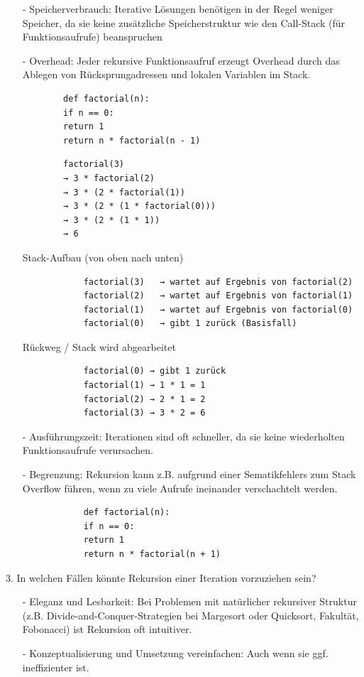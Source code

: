 \documentclass[a4paper,12pt]{article}
\begin{document}
	\begin{enumerate}
		\item[-] Speicherverbrauch: Iterative Lösungen benötigen in der Regel weniger Speicher, da sie keine zusätzliche Speicherstruktur wie den Call-Stack (für Funktionsaufrufe) beanspruchen
		\item[-] Overhead: Jeder rekursive Funktionsaufruf erzeugt Overhead durch das Ablegen von Rücksprungadressen und lokalen Variablen im Stack.
		\begin{verbatim}
		def factorial(n):
		if n == 0:
		return 1
		return n * factorial(n - 1)
		\end{verbatim}
		
		\begin{verbatim}
		factorial(3)
		→ 3 * factorial(2)
		→ 3 * (2 * factorial(1))
		→ 3 * (2 * (1 * factorial(0)))
		→ 3 * (2 * (1 * 1))
		→ 6	
		\end{verbatim}
		Stack-Aufbau (von oben nach unten)
		\begin{verbatim}
			factorial(3)   → wartet auf Ergebnis von factorial(2)
			factorial(2)   → wartet auf Ergebnis von factorial(1)
			factorial(1)   → wartet auf Ergebnis von factorial(0)
			factorial(0)   → gibt 1 zurück (Basisfall)
		\end{verbatim}
		Rückweg / Stack wird abgearbeitet
		\begin{verbatim}
			factorial(0) → gibt 1 zurück
			factorial(1) → 1 * 1 = 1
			factorial(2) → 2 * 1 = 2
			factorial(3) → 3 * 2 = 6
		\end{verbatim}
		
		\item[-] Ausführungszeit: Iterationen sind oft schneller, da sie keine wiederholten Funktionsaufrufe verursachen.
		
		\item[-] Begrenzung: Rekursion kann z.B. aufgrund einer Sematikfehlers zum Stack Overflow führen, wenn zu viele Aufrufe ineinander verschachtelt werden.
		\begin{verbatim}
			def factorial(n):
			if n == 0:
			return 1
			return n * factorial(n + 1)
		\end{verbatim}
	\end{enumerate}
		3. In welchen Fällen könnte Rekursion einer Iteration vorzuziehen sein?
		\begin{enumerate}
		\item[-] Eleganz und Lesbarkeit: Bei Problemen mit natürlicher rekursiver Struktur (z.B. Divide-and-Conquer-Strategien bei Margesort oder Quicksort, Fakultät, Fobonacci) ist Rekursion oft intuitiver.
		\item[-] Konzeptualisierung und Umsetzung vereinfachen: Auch wenn sie ggf. ineffizienter ist.
		\end{enumerate}
\end{document}
